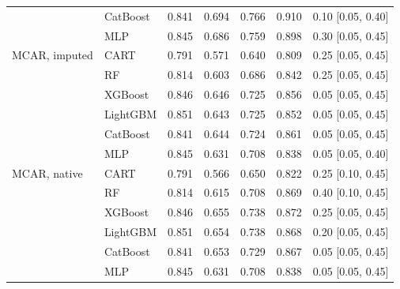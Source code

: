 \documentclass[pdflatex,sn-mathphys]{sn-jnl}
\theoremstyle{thmstyleone}
\begin{document}
\begin{table}[htbp]
\begin{tabular}{@{}llrrrrl@{}}
 & CatBoost & 0.841 & 0.694 & 0.766 & 0.910 & 0.10 [0.05, 0.40] \\
 & MLP & 0.845 & 0.686 & 0.759 & 0.898 & 0.30 [0.05, 0.45] \\
\midrule
MCAR, imputed & CART & 0.791 & 0.571 & 0.640 & 0.809 & 0.25 [0.05, 0.45] \\
 & RF & 0.814 & 0.603 & 0.686 & 0.842 & 0.25 [0.05, 0.45] \\
 & XGBoost & 0.846 & 0.646 & 0.725 & 0.856 & 0.05 [0.05, 0.45] \\
 & LightGBM & 0.851 & 0.643 & 0.725 & 0.852 & 0.05 [0.05, 0.45] \\
 & CatBoost & 0.841 & 0.644 & 0.724 & 0.861 & 0.05 [0.05, 0.45] \\
 & MLP & 0.845 & 0.631 & 0.708 & 0.838 & 0.05 [0.05, 0.40] \\
\midrule
MCAR, native & CART & 0.791 & 0.566 & 0.650 & 0.822 & 0.25 [0.10, 0.45] \\
 & RF & 0.814 & 0.615 & 0.708 & 0.869 & 0.40 [0.10, 0.45] \\
 & XGBoost & 0.846 & 0.655 & 0.738 & 0.872 & 0.25 [0.05, 0.45] \\
 & LightGBM & 0.851 & 0.654 & 0.738 & 0.868 & 0.20 [0.05, 0.45] \\
 & CatBoost & 0.841 & 0.653 & 0.729 & 0.867 & 0.05 [0.05, 0.45] \\
 & MLP & 0.845 & 0.631 & 0.708 & 0.838 & 0.05 [0.05, 0.45] \\
\bottomrule
\end{tabular}
\end{table}
\end{document}
